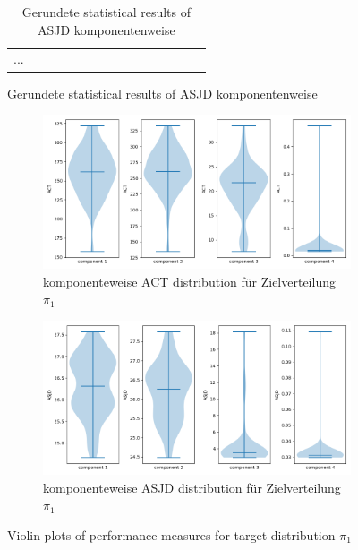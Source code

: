 \documentclass{scrartcl}
\begin{document}
    \begin{figure}[H]
        \begin{table}[H]
            \centering
            \begin{tabular}{|l|l|l|l|l|l|l|l|l|l|l|l|l|l|l|}
                ...
            \end{tabular}
            \caption{Gerundete statistical results of ASJD komponentenweise}
            \label{stat_results_asjd}
        \end{table}
    \end{figure}

    \begin{figure}
        \centering
        \begin{subfigure}{0.45\textheight}
              \centering
              \includegraphics[width=.8\linewidth]{../figs/ACT_pi_1.png}
              \caption{komponenteweise ACT distribution für Zielverteilung $\pi_1$}
              \label{violin_plots_pi_1_act}
        \end{subfigure}
        \begin{subfigure}{0.45\textheight}
              \centering
              \includegraphics[width=.8\linewidth]{../figs/ASJD_pi_1.png}
              \caption{komponenteweise ASJD distribution für Zielverteilung $\pi_1$}
              \label{violin_plots_pi_1_asjd}
        \end{subfigure}
        \caption{Violin plots of performance measures for target distribution $\pi_1$}
        \label{violin_plots_pi_1}
    \end{figure}
\end{document}
